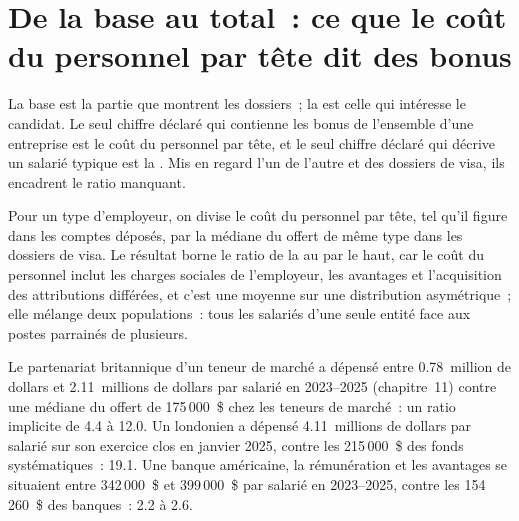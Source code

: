 \section{De la base au total~: ce que le coût du personnel par tête dit des bonus}

La base est la partie que montrent les dossiers~; la  est celle qui intéresse le candidat. Le seul chiffre déclaré qui contienne
les bonus de l'ensemble d'une entreprise est le coût du personnel par tête, et le seul chiffre déclaré qui décrive un salarié typique est
la . Mis en regard l'un de l'autre et des dossiers de visa, ils encadrent le ratio manquant.

\begin{method}\label{met:in:pay-levels-by-role-firm-type-and-seniority:ratio}
Pour un type d'employeur, on divise le coût du personnel par tête, tel qu'il figure dans les comptes déposés, par la médiane du  offert
de même type dans les dossiers de visa. Le résultat borne le ratio de la  au  par le haut, car le coût du personnel inclut les
charges sociales de l'employeur, les avantages et l'acquisition des attributions différées, et c'est une moyenne sur une distribution asymétrique~; elle mélange
deux populations~: tous les salariés d'une seule entité face aux postes parrainés de plusieurs.
\end{method}

\begin{example}\label{ex:in:pay-levels-by-role-firm-type-and-seniority:ratio}
Le partenariat britannique d'un teneur de marché a dépensé entre 0.78~million de dollars et 2.11~millions de dollars par salarié en 2023--2025 (chapitre~11)
contre une médiane du  offert de 175\,000~\$ chez les teneurs de marché~: un ratio implicite de 4.4 à 12.0. Un  londonien
a dépensé 4.11~millions de dollars par salarié sur son exercice clos en janvier 2025, contre les 215\,000~\$ des fonds systématiques~: 19.1. Une
banque américaine, la rémunération et les avantages se situaient entre 342\,000~\$ et 399\,000~\$ par salarié en 2023--2025, contre les 154\,260~\$ des banques~:
2.2 à 2.6.
\end{example}

